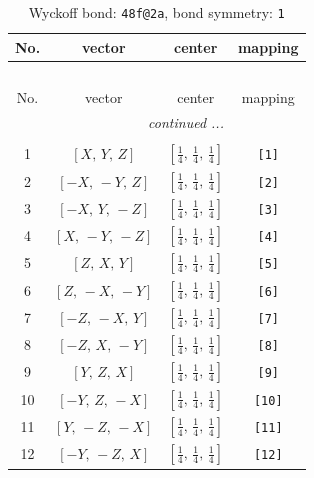 \documentclass[fleqn,8pt]{jsarticle}
\begin{document}
\begin{longtable}{cccc}
\caption{Wyckoff bond: {\tt 48f@2a}, bond symmetry: {\tt 1}}
 \\
 \hline \hline
No. & vector & center & mapping \\ \hline \endfirsthead

\multicolumn{3}{l}{\tablename\ \thetable{}} \\
 \hline \hline
No. & vector & center & mapping \\ \hline \endhead

 \hline \hline
\multicolumn{3}{r}{\footnotesize\it continued ...} \\ \endfoot

 \hline \hline
\multicolumn{3}{r}{} \\ \endlastfoot

1 & $\left[ X,\, Y,\, Z \right]$ & $\left[ \frac{1}{4},\, \frac{1}{4},\, \frac{1}{4} \right]$ & {\tt [1]} \\ \hline
2 & $\left[ - X,\, - Y,\, Z \right]$ & $\left[ \frac{1}{4},\, \frac{1}{4},\, \frac{1}{4} \right]$ & {\tt [2]} \\ \hline
3 & $\left[ - X,\, Y,\, - Z \right]$ & $\left[ \frac{1}{4},\, \frac{1}{4},\, \frac{1}{4} \right]$ & {\tt [3]} \\ \hline
4 & $\left[ X,\, - Y,\, - Z \right]$ & $\left[ \frac{1}{4},\, \frac{1}{4},\, \frac{1}{4} \right]$ & {\tt [4]} \\ \hline
5 & $\left[ Z,\, X,\, Y \right]$ & $\left[ \frac{1}{4},\, \frac{1}{4},\, \frac{1}{4} \right]$ & {\tt [5]} \\ \hline
6 & $\left[ Z,\, - X,\, - Y \right]$ & $\left[ \frac{1}{4},\, \frac{1}{4},\, \frac{1}{4} \right]$ & {\tt [6]} \\ \hline
7 & $\left[ - Z,\, - X,\, Y \right]$ & $\left[ \frac{1}{4},\, \frac{1}{4},\, \frac{1}{4} \right]$ & {\tt [7]} \\ \hline
8 & $\left[ - Z,\, X,\, - Y \right]$ & $\left[ \frac{1}{4},\, \frac{1}{4},\, \frac{1}{4} \right]$ & {\tt [8]} \\ \hline
9 & $\left[ Y,\, Z,\, X \right]$ & $\left[ \frac{1}{4},\, \frac{1}{4},\, \frac{1}{4} \right]$ & {\tt [9]} \\ \hline
10 & $\left[ - Y,\, Z,\, - X \right]$ & $\left[ \frac{1}{4},\, \frac{1}{4},\, \frac{1}{4} \right]$ & {\tt [10]} \\ \hline
11 & $\left[ Y,\, - Z,\, - X \right]$ & $\left[ \frac{1}{4},\, \frac{1}{4},\, \frac{1}{4} \right]$ & {\tt [11]} \\ \hline
12 & $\left[ - Y,\, - Z,\, X \right]$ & $\left[ \frac{1}{4},\, \frac{1}{4},\, \frac{1}{4} \right]$ & {\tt [12]} \\ \hline

\end{longtable}
\end{document}
